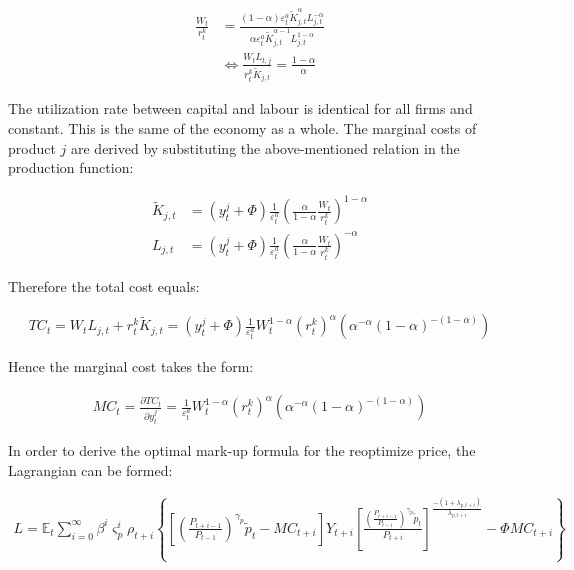 \documentclass{pracamgr}
\numberwithin{equation}{section}
\begin{document}
\begin{align}
\frac{W_{t}}{r_{t}^{k}} &= \frac{(1-\alpha)\varepsilon_{t}^{a} \widetilde{K}_{j,t}^{\alpha} L_{j,t}^{-\alpha} }{\alpha \varepsilon_{t}^{a} \widetilde{K}_{j,t}^{\alpha-1} L_{j,t}^{1-\alpha} } \nonumber \\
& \iff \frac{W_{t}L_{t,j}}{r_{t}^{k}  \widetilde{K}_{j,t}} = \frac{1-\alpha}{\alpha}
\end{align}

The utilization rate between capital and labour is identical for all firms and constant. This is the same of the economy as a whole. The marginal costs of product $j$ are derived by substituting the above-mentioned relation in the production function:

\begin{align}
\widetilde{K}_{j,t} &= \left(y_{t}^{j} + \Phi \right) \frac{1}{\varepsilon_{t}^{a}} \left(\frac{\alpha}{1-\alpha} \frac{W_{t}}{r_{t}^{k}} \right)^{1-\alpha} \\
L_{j,t} &= \left(y_{t}^{j} + \Phi \right) \frac{1}{\varepsilon_{t}^{a}} \left(\frac{\alpha}{1-\alpha} \frac{W_{t}}{r_{t}^{k}} \right)^{-\alpha}
\end{align}

Therefore the total cost equals:

\begin{align}
TC_{t} = W_{t}L_{j,t}  + r_{t}^{k} \widetilde{K}_{j,t} =  \left(y_{t}^{j} + \Phi \right) \frac{1}{\varepsilon_{t}^{a}} W_{t}^{1-\alpha} \left(r_{t}^{k} \right)^{\alpha} \left( \alpha^{-\alpha} (1-\alpha)^{-(1-\alpha)}\right)
\end{align}

Hence the marginal cost takes the form:

\begin{align}
MC_{t} = \frac{\partial TC_{t}}{\partial y_{t}^{j}} = \frac{1}{\varepsilon_{t}^{a}} W_{t}^{1-\alpha} \left(r_{t}^{k} \right)^{\alpha} \left( \alpha^{-\alpha} (1-\alpha)^{-(1-\alpha)}\right)
\end{align}

In order to derive the optimal mark-up formula for the reoptimize price, the Lagrangian can be formed:

\begin{align}
L = \mathbb{E}_{t}  \sum\limits_{i=0}^{\infty} \beta^{i} \varsigma_{p}^{i} \rho_{t+i} \left\{ \left[
\left(\frac{P_{t+i-1}}{P_{t-1}} \right)^{\gamma_{p}}\widetilde{p}_{t} - MC_{t+i}
\right] Y_{t+i} \left[ \frac{\left(\frac{P_{t+i-1}}{P_{t-1}} \right)^{\gamma_{p}}\widetilde{p}_{t}}{P_{t+i}} \right]^{\frac{-(1+\lambda_{p,t+i})}{\lambda_{p,t+i}}} - \Phi MC_{t+i} \right\}
\end{align}
\end{document}

